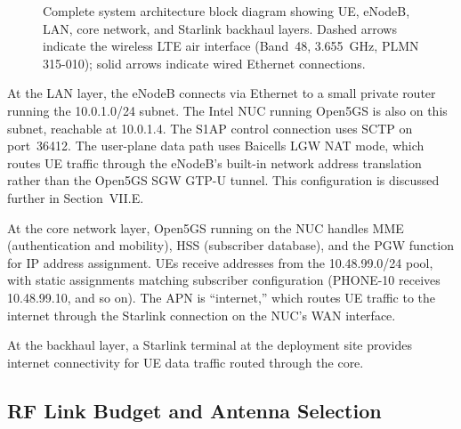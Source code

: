 \documentclass[
    left=1.5in,
    right=1.25in,
    top=1.25in,
    bottom=1.25in
]{CalPolySeniorProject}
\begin{document}
\begin{figure}[!ht]
    \caption[System architecture block diagram]{Complete system architecture
    block diagram showing UE, eNodeB, LAN, core network, and Starlink
    backhaul layers. Dashed arrows indicate the wireless LTE air interface
    (Band~48, 3.655~GHz, PLMN 315-010); solid arrows indicate wired
    Ethernet connections.}
    \label{fig:sysarch}
\end{figure}

At the LAN layer, the eNodeB connects via Ethernet to a small private router
running the 10.0.1.0/24 subnet. The Intel NUC running Open5GS is also on this
subnet, reachable at 10.0.1.4. The S1AP control connection uses SCTP on
port~36412. The user-plane data path uses Baicells LGW NAT mode, which routes
UE traffic through the eNodeB's built-in network address translation rather than
the Open5GS SGW GTP-U tunnel. This configuration is discussed further in
Section~VII.E.

At the core network layer, Open5GS running on the NUC handles MME
(authentication and mobility), HSS (subscriber database), and the PGW function
for IP address assignment. UEs receive addresses from the 10.48.99.0/24 pool,
with static assignments matching subscriber configuration (PHONE-10 receives
10.48.99.10, and so on). The APN is ``internet,'' which routes UE traffic to the
internet through the Starlink connection on the NUC's WAN interface.

At the backhaul layer, a Starlink terminal at the deployment site provides
internet connectivity for UE data traffic routed through the core.

\subsection{RF Link Budget and Antenna Selection}
\end{document}
